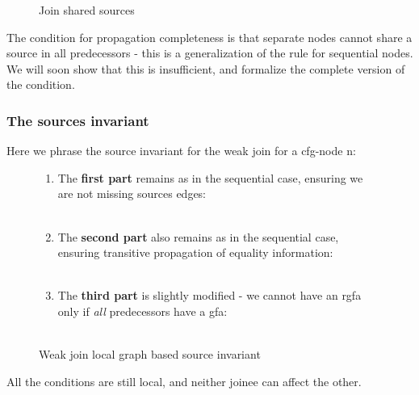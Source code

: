 \begin{figure}[H]

\caption{
Join shared sources
}
\label{snippet3.17c_graph}
\end{figure}

The condition for propagation completeness is that separate nodes cannot share a source in all predecessors - this is a generalization of the rule for sequential nodes. We will soon show that this is insufficient, and formalize the complete version of the condition.

\subsubsection{The sources invariant}
Here we phrase the source invariant for the weak join for a cfg-node n:
\begin{figure}[H]
\begin{enumerate}
\item The \textbf{first part} remains as in the sequential case, ensuring we are not missing sources edges:\\
	\\
\item The \textbf{second part} also remains as in the sequential case, ensuring transitive propagation of equality information:\\
	\\
\item The \textbf{third part} is slightly modified - we cannot have an rgfa only if \emph{all} predecessors have a gfa:\\
	\\
\end{enumerate}
\caption{Weak join local graph based source invariant}
\label{weak_join_source_invariant}
\end{figure}
All the conditions are still local, and neither joinee can affect the other.

